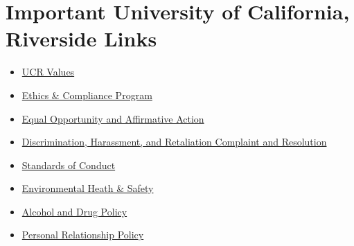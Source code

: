 \documentclass[
]{book}
\providecommand{\tightlist}{%
  \setlength{\itemsep}{0pt}\setlength{\parskip}{0pt}}
\begin{document}
\hypertarget{important-university-of-california-riverside-links}{%
\section{Important University of California, Riverside Links}\label{important-university-of-california-riverside-links}}

\begin{itemize}
\tightlist
\item
  \href{https://tartansoul.ucr.edu/}{UCR Values}
\item
  \href{https://compliance.ucr.edu/ethics-compliance-program}{Ethics \& Compliance Program}
\item
  \href{https://titleix.ucr.edu/}{Equal Opportunity and Affirmative Action}
\item
  \href{https://fboapps.ucr.edu/policies/index.php?path=printPolicies.php\&policy=650-75}{Discrimination, Harassment, and Retaliation Complaint and Resolution}
\item
  \href{https://conduct.ucr.edu/policies/standards-of-conduct}{Standards of Conduct}
\item
  \href{https://ehs.ucr.edu/}{Environmental Heath \& Safety}
\item
  \href{https://fboapps.ucr.edu/policies/index.php?path=viewPolicies.php\&policy=650-83}{Alcohol and Drug Policy}
\item
  \href{https://fboapps.ucr.edu/policies/index.php?path=viewPolicies.php\&policy=650-74}{Personal Relationship Policy}
\end{itemize}

  
\end{document}
